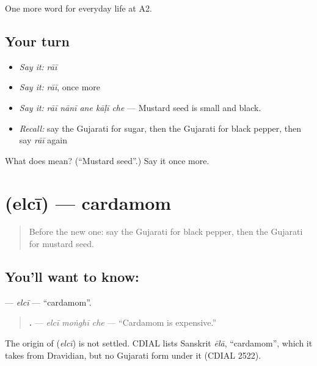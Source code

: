 \begin{grammarlens}[title={What you've built}]
One more word for everyday life at A2.
\end{grammarlens}

\subsection*{Your turn}
\begin{itemize}
\raggedright
  \item \emph{Say it:} \emph{rāī}
  \item \emph{Say it:} \emph{rāī}, once more
  \item \emph{Say it:} \emph{rāī nānī ane kāḷī che} — Mustard seed is small and black.
  \item \emph{Recall:} say the Gujarati for sugar, then the Gujarati for black pepper, then say \emph{rāī} again
\end{itemize}

\begin{tcolorbox}[breakable,colback=teal!4,colframe=teal!35!black,title={Before you move on}]
What does  mean? (\textquotedblleft{}Mustard seed\textquotedblright{}.) Say it once more.
\end{tcolorbox}
\section[\texorpdfstring{\gu{એલચી} (elcī)}{એલચી (elcī)}]{ (elcī) — cardamom}

\label{lesson:GU-C164-elci}



\begin{quote}
Before the new one: say the Gujarati for black pepper, then the Gujarati for mustard seed.
\end{quote}

\subsection*{You'll want to know: }
\textbf{} — \emph{elcī} — \textquotedblleft{}cardamom\textquotedblright{}.

\begin{quote}
\textbf{  .} — \emph{elcī moṅghī che} — \textquotedblleft{}Cardamom is expensive.\textquotedblright{}
\end{quote}

\begin{cousinweb}
The origin of \textbf{} (\emph{elcī}) is not settled. CDIAL lists Sanskrit \emph{ēlā}, \textquotedblleft{}cardamom\textquotedblright{}, which it takes from Dravidian, but no Gujarati form under it (CDIAL 2522).
\end{cousinweb}

